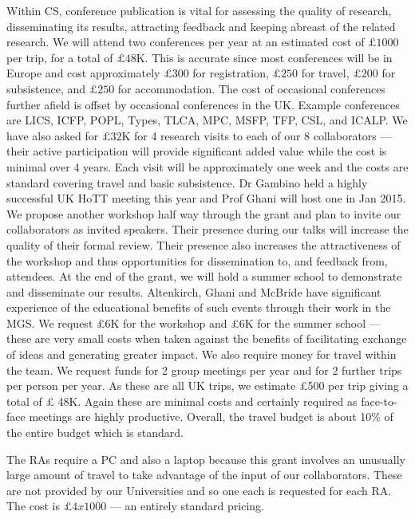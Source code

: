 \documentclass[a4paper,11pt]{article}
\begin{document}
 Within CS, conference publication is
vital for assessing the quality of research, disseminating its
results, attracting feedback and keeping abreast of the related
research.  We will attend two conferences per year at an estimated
cost of $\pounds 1000$ per trip, for a total of $\pounds
48$K. This is accurate since most conferences will
be in Europe and cost approximately $\pounds 300$ for registration,
$\pounds 250$ for travel, $\pounds 200$ for subsistence, and $\pounds
250$ for accommodation. The cost of occasional conferences further
afield is offset by occasional conferences in the UK. Example
conferences are LICS, ICFP, POPL, Types, TLCA, MPC, MSFP, TFP, CSL,
and ICALP.  We have also asked for $\pounds 32$K for 4 research visits
to each of our 8 collaborators --- their active participation will
provide significant added value while the cost is minimal 
over 4 years. Each visit will be approximately one week and the costs
are standard covering travel and basic subsistence. Dr Gambino held a
highly successful UK HoTT meeting this year and Prof Ghani will host
one in Jan 2015. We propose another workshop half way through the
grant and plan to invite our collaborators as invited speakers.
Their presence during our talks will increase the quality of their
formal review. Their presence also increases the attractiveness of the
workshop and thus opportunities for dissemination to, and feedback
from, attendees. At the end of the grant, we will hold a summer school
to demonstrate and disseminate our results. Altenkirch, Ghani and
McBride have significant experience of the educational benefits of
such events through their work in the MGS. We request \pounds 6K for
the workshop and \pounds 6K for the summer school --- these are very
small costs when taken against the benefits of facilitating exchange
of ideas and generating greater impact. We also require money for
travel within the team. We request funds for 2 group meetings per year
and for 2 further trips per person per year. As these are all UK
trips, we estimate \pounds 500 per trip giving a total of \pounds
48K. Again these are minimal costs and certainly required as
face-to-face meetings are highly productive. Overall, the travel
budget is about 10\% of the entire budget which is standard.

\vspace{0.02in}

 The RAs require a PC and also a
laptop because this grant involves an unusually large amount of travel to take
advantage of the input of our collaborators. These are not provided by
our Universities and so one each is requested for each RA. The cost is
$\pounds 4x1000$ --- an entirely standard
pricing. 
\end{document}
